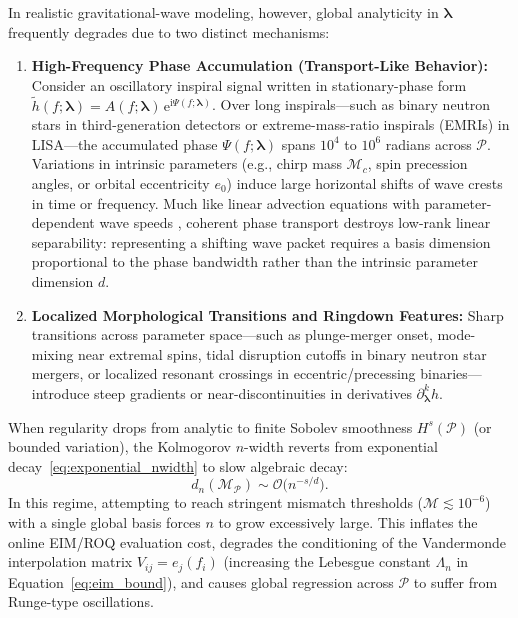 \documentclass[11pt, a4paper]{article}
\begin{document}
In realistic gravitational-wave modeling, however, global analyticity in $\boldsymbol{\lambda}$ frequently degrades due to two distinct mechanisms:
\begin{enumerate}
    \item \textbf{High-Frequency Phase Accumulation (Transport-Like Behavior):} Consider an oscillatory inspiral signal written in stationary-phase form $\tilde{h}(f; \boldsymbol{\lambda}) = A(f; \boldsymbol{\lambda})\,\mathrm{e}^{\mathrm{i}\Psi(f; \boldsymbol{\lambda})}$. Over long inspirals---such as binary neutron stars in third-generation detectors or extreme-mass-ratio inspirals (EMRIs) in LISA---the accumulated phase $\Psi(f; \boldsymbol{\lambda})$ spans $10^4$ to $10^6$ radians across $\mathcal{P}$. Variations in intrinsic parameters (e.g., chirp mass $\mathcal{M}_c$, spin precession angles, or orbital eccentricity $e_0$) induce large horizontal shifts of wave crests in time or frequency. Much like linear advection equations with parameter-dependent wave speeds \cite{Ohlberger2016,Greif2019}, coherent phase transport destroys low-rank linear separability: representing a shifting wave packet requires a basis dimension proportional to the phase bandwidth rather than the intrinsic parameter dimension $d$.
    \item \textbf{Localized Morphological Transitions and Ringdown Features:} Sharp transitions across parameter space---such as plunge-merger onset, mode-mixing near extremal spins, tidal disruption cutoffs in binary neutron star mergers, or localized resonant crossings in eccentric/precessing binaries---introduce steep gradients or near-discontinuities in derivatives $\partial_{\boldsymbol{\lambda}}^k h$.
\end{enumerate}

When regularity drops from analytic to finite Sobolev smoothness $H^s(\mathcal{P})$ (or bounded variation), the Kolmogorov $n$-width reverts from exponential decay~\eqref{eq:exponential_nwidth} to slow algebraic decay:
\begin{equation}
d_n(\mathcal{M}_{\mathcal{P}}) \sim \mathcal{O}\bigl(n^{-s/d}\bigr) .
\label{eq:algebraic_nwidth}
\end{equation}
In this regime, attempting to reach stringent mismatch thresholds ($\mathcal{M} \lesssim 10^{-6}$) with a single global basis forces $n$ to grow excessively large. This inflates the online EIM/ROQ evaluation cost, degrades the conditioning of the Vandermonde interpolation matrix $V_{ij} = e_j(f_i)$ (increasing the Lebesgue constant $\Lambda_n$ in Equation~\eqref{eq:eim_bound}), and causes global regression across $\mathcal{P}$ to suffer from Runge-type oscillations.
\end{document}
